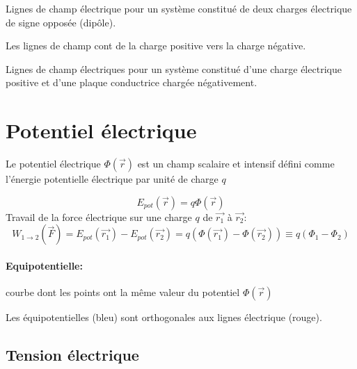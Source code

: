 \documentclass[
    11pt,
    a4paper,
    oneside,
    headinlcude, footinclude,
    twoside,
]{report}
\renewcommand{\vec}[1]{\overrightarrow{#1}}
\begin{document}
Lignes de champ électrique pour un système constitué de deux charges électrique
de  signe opposée (dip\^ole).

Les lignes de champ cont de la charge positive vers la charge négative.

\vspace{.5cm}


Lignes de champ électriques pour un système constitué d'une charge électrique
positive et d'une plaque conductrice chargée négativement.


\section{Potentiel électrique}

Le potentiel électrique $\Phi(\vec r)$ est un champ scalaire et intensif défini
comme l'énergie potentielle électrique par unité de charge $q$

\begin{equation}
    \label{eq:7.6}
    E_{pot}(\vec r) = q \Phi(\vec r)
\end{equation}
Travail de la force électrique sur une charge $q$ de $\vec{r_{1}}$ à $\vec{r_{2}}$:
\begin{equation}
    \label{eq:7.7}
    W_{1\to 2}(\vec F) = E_{pot}(\vec{r_{1}}) - E_{pot}(\vec{r_{2}}) = q
    (\Phi(\vec{r_{1}}) - \Phi(\vec{r_{2}})) \equiv q (\Phi_1 - \Phi_2) 
\end{equation}

\begin{center}
    \begin{minipage}{.5\linewidth}
        \setlength{\parskip}{.3em}
        \paragraph{Equipotentielle:}
        courbe dont les points ont la même valeur du potentiel $\Phi(\vec r)$

        Les équipotentielles (bleu) sont orthogonales aux lignes électrique
        (rouge).
    \end{minipage}
    \begin{minipage}{.49\linewidth}
        \resizebox{\textwidth}{!}{
        }
    \end{minipage}
\end{center}

\subsection{Tension électrique} %
\end{document}
